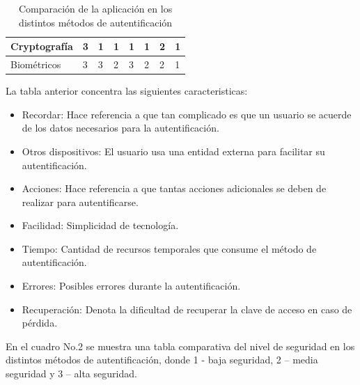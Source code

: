\documentclass[12pt, a4paper, titlepage]{article}
\begin{document}
\begin{table}[htb]
{\begin{tabular}{l|l|l|l|l|l|l|l|}
					\multicolumn{1}{|l|}{Cryptografía}                                                     & 3        & 1                                                            & 1        & 1         & 1      & 2       & 1            \\ \hline
					\multicolumn{1}{|l|}{Biométricos}                                                      & 3        & 3                                                            & 2        & 3         & 2      & 2       & 1            \\ \hline
				\end{tabular}
			}
			\caption{Comparación de la aplicación en los distintos métodos de autentificación}
		\end{table}
		
		La tabla anterior concentra las siguientes caracteristicas:
		
		\begin{itemize}
			\item Recordar: Hace referencia a que tan complicado es que un usuario se acuerde de los datos necesarios para la autentificación. 
			\item Otros dispositivos: El usuario usa una entidad externa para facilitar su autentificación.
			\item Acciones: Hace referencia a que tantas acciones adicionales se deben de realizar para autentificarse.
			\item Facilidad: Simplicidad de tecnología.
			\item Tiempo: Cantidad de recursos temporales que consume el método de autentificación.
			\item Errores: Posibles errores durante la autentificación. 
			\item Recuperación: Denota la dificultad de recuperar la clave de acceso en caso de pérdida.
		\end{itemize}
		
		En el cuadro No.2 se muestra una tabla comparativa del nivel de seguridad en los distintos métodos de autentificación, donde 1 - baja seguridad, 2 – media seguridad y 3 – alta seguridad.
		
\end{document}
